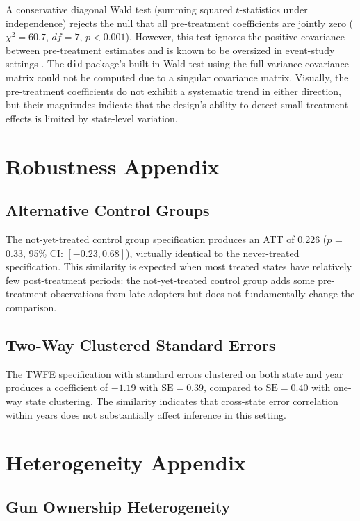\documentclass[12pt]{article}
\begin{document}
A conservative diagonal Wald test (summing squared $t$-statistics under independence) rejects the null that all pre-treatment coefficients are jointly zero ($\chi^2 = 60.7$, $df = 7$, $p < 0.001$). However, this test ignores the positive covariance between pre-treatment estimates and is known to be oversized in event-study settings \citep{roth2023s}. The \texttt{did} package's built-in Wald test using the full variance-covariance matrix could not be computed due to a singular covariance matrix. Visually, the pre-treatment coefficients do not exhibit a systematic trend in either direction, but their magnitudes indicate that the design's ability to detect small treatment effects is limited by state-level variation.

\section{Robustness Appendix}
\label{sec:rob_appendix}

\subsection{Alternative Control Groups}

The not-yet-treated control group specification produces an ATT of 0.226 ($p$ = 0.33, 95\% CI: $[-0.23, 0.68]$), virtually identical to the never-treated specification. This similarity is expected when most treated states have relatively few post-treatment periods: the not-yet-treated control group adds some pre-treatment observations from late adopters but does not fundamentally change the comparison.

\subsection{Two-Way Clustered Standard Errors}

The TWFE specification with standard errors clustered on both state and year produces a coefficient of $-1.19$ with $\text{SE} = 0.39$, compared to $\text{SE} = 0.40$ with one-way state clustering. The similarity indicates that cross-state error correlation within years does not substantially affect inference in this setting.


\section{Heterogeneity Appendix}

\subsection{Gun Ownership Heterogeneity}
\end{document}
